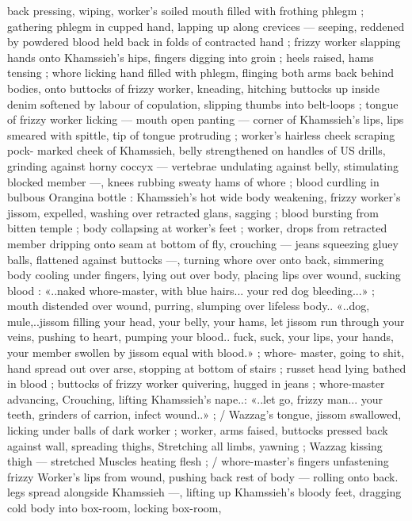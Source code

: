 back pressing, wiping, worker's soiled mouth filled with frothing
phlegm ; gathering phlegm in cupped hand, lapping up along
crevices --- seeping, reddened by powdered blood held back in folds
of contracted hand ; frizzy worker slapping hands onto Khamssieh's
hips, fingers digging into groin ; heels raised, hams tensing ; whore
licking hand filled with phlegm, flinging both arms back behind
bodies, onto buttocks of frizzy worker, kneading, hitching buttocks
up inside denim softened by labour of copulation, slipping thumbs
into belt-loops ; tongue of frizzy worker licking --- mouth open
panting --- corner of Khamssieh’s lips, lips smeared with spittle, tip
of tongue protruding ; worker's hairless cheek scraping pock-
marked cheek of Khamssieh, belly strengthened on handles of US
drills, grinding against horny coccyx --- vertebrae undulating against
belly, stimulating blocked member ---, knees rubbing sweaty hams of
whore ; blood curdling in bulbous Orangina bottle : Khamssieh’s hot
wide body weakening, frizzy worker's jissom, expelled, washing over
retracted glans, sagging ; blood bursting from bitten temple ; body
collapsing at worker's feet ; worker, drops from retracted member
dripping onto seam at bottom of fly, crouching --- jeans squeezing
gluey balls, flattened against buttocks ---, turning whore over onto
back, simmering body cooling under fingers, lying out over body,
placing lips over wound, sucking blood : «..naked whore-master, with
blue hairs... your red dog bleeding...» ; mouth distended over wound,
purring, slumping over lifeless body.. «..dog, mule,..jissom filling
your head, your belly, your hams, let jissom run through your veins,
pushing to heart, pumping your blood.. fuck, suck, your lips, your
hands, your member swollen by jissom equal with blood.» ; whore-
master, going to shit, hand spread out over arse, stopping at bottom
of stairs ; russet head lying bathed in blood ; buttocks of frizzy
worker quivering, hugged in jeans ; whore-master advancing,
Crouching, lifting Khamssieh's nape..: «..let go, frizzy man... your
teeth, grinders of carrion, infect wound..» ; / Wazzag's tongue,
jissom swallowed, licking under balls of dark worker ; worker, arms
faised, buttocks pressed back against wall, spreading thighs,
Stretching all limbs, yawning ; Wazzag kissing thigh --- stretched
Muscles heating flesh ; / whore-master’s fingers unfastening frizzy
Worker's lips from wound, pushing back rest of body --- rolling onto
back. legs spread alongside Khamssieh ---, lifting up Khamssieh's
bloody feet, dragging cold body into box-room, locking box-room,
